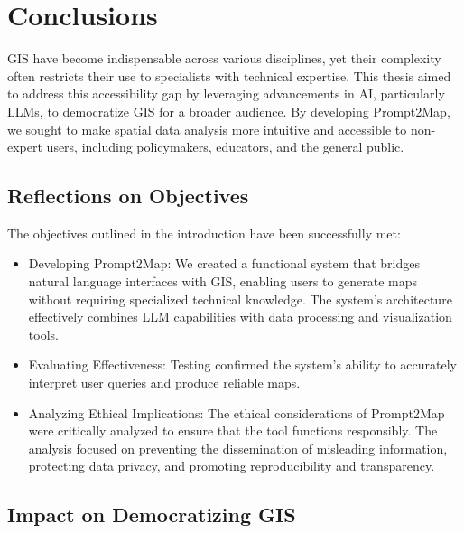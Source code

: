 
%
\chapter{Conclusions}
\label{cha:conclusions}

GIS have become indispensable across various disciplines, yet their complexity often restricts their use to specialists with technical expertise. This thesis aimed to address this accessibility gap by leveraging advancements in AI, particularly LLMs, to democratize GIS for a broader audience. By developing Prompt2Map, we sought to make spatial data analysis more intuitive and accessible to non-expert users, including policymakers, educators, and the general public.

\section{Reflections on Objectives}

The objectives outlined in the introduction have been successfully met:

\begin{itemize}
    \item Developing Prompt2Map: We created a functional system that bridges natural language interfaces with GIS, enabling users to generate maps without requiring specialized technical knowledge. The system's architecture effectively combines LLM capabilities with data processing and visualization tools.

    \item Evaluating Effectiveness: Testing confirmed the system's ability to accurately interpret user queries and produce reliable maps.

    \item Analyzing Ethical Implications: The ethical considerations of Prompt2Map were critically analyzed to ensure that the tool functions responsibly. The analysis focused on preventing the dissemination of misleading information, protecting data privacy, and promoting reproducibility and transparency.
\end{itemize}

\section{Impact on Democratizing GIS}

